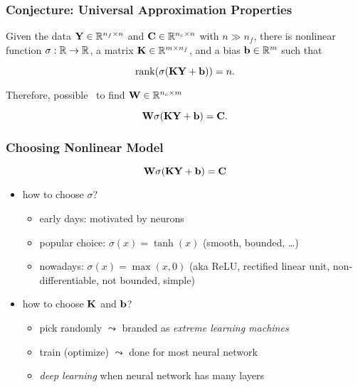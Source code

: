 \documentclass[12pt,fleqn,handout]{beamer}
\begin{document}
\begin{frame}[fragile]\frametitle{Conjecture: Universal Approximation Properties}

Given the data ${\bf Y} \in \mathbb{R}^{n_f \times n}$ and ${\bf C} \in \mathbb{R}^{n_c \times n}$
with $n\gg n_f$, there is nonlinear function $\sigma:\mathbb{R} \to \mathbb{R}$, a matrix ${\bf K} \in \mathbb{R}^{m \times n_f}$, and a bias ${\bf b} \in \mathbb{R}^m$ such that

$$
 {\rm rank}(\sigma({\bf K} {\bf Y} + {\bf b})) = n.
$$

\bigskip
\pause
Therefore, possible~\cite{Cybenko1989,HornikEtAl1989} to find ${{\bf W}}\in\mathbb{R}^{n_c\times m}$

$${\bf W} \sigma( {\bf K} {\bf Y} + {\bf b}) = {\bf C}.$$

\end{frame}


\begin{frame}[fragile]\frametitle{Choosing Nonlinear Model}

$$ {\bf W}  \sigma({\bf K} {\bf Y}+ {\bf b})= {\bf C} $$
\begin{itemize}
\item how to choose $\sigma$?
\pause
\begin{itemize}
	\item early days: motivated by neurons
	\item popular choice: $\sigma(x) = \tanh(x)$ (smooth, bounded, \ldots)
	\item nowadays: $\sigma(x) = \max(x,0)$ (aka ReLU, rectified linear unit, non-differentiable, not bounded, simple)
\end{itemize}
\pause
\item how to choose ${\bf K}$ and ${\bf b}$?
\pause
\begin{itemize}
	\item pick randomly $\leadsto$ branded as \emph{extreme learning machines}~\cite{HuangEtAl2006}
	\item train (optimize) $\leadsto$ done for most neural network
	\item \emph{deep learning} when neural network has many layers
\end{itemize}
\end{itemize}


\end{frame}
\end{document}
